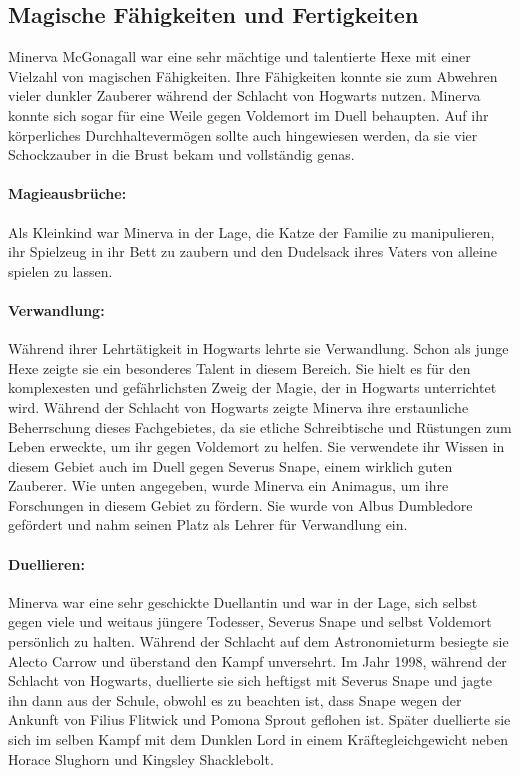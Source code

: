 \documentclass[a4paper, 10pt]{article}
\begin{document}
\subsection*{\Large Magische Fähigkeiten und Fertigkeiten}
Minerva McGonagall war eine sehr mächtige und talentierte Hexe mit einer Vielzahl von magischen Fähigkeiten. Ihre Fähigkeiten konnte sie zum Abwehren vieler dunkler Zauberer während der Schlacht von Hogwarts nutzen. Minerva konnte sich sogar für eine Weile gegen Voldemort im Duell behaupten. Auf ihr körperliches Durchhaltevermögen sollte auch hingewiesen werden, da sie vier Schockzauber in die Brust bekam und vollständig genas.
\paragraph{Magieausbrüche:} 
Als Kleinkind war Minerva in der Lage, die Katze der Familie zu manipulieren, ihr Spielzeug in ihr Bett zu zaubern und den Dudelsack ihres Vaters von alleine spielen zu lassen.
\paragraph{Verwandlung:} 
Während ihrer Lehrtätigkeit in Hogwarts lehrte sie Verwandlung. Schon als junge Hexe zeigte sie ein besonderes Talent in diesem Bereich. Sie hielt es für den komplexesten und gefährlichsten Zweig der Magie, der in Hogwarts unterrichtet wird. Während der Schlacht von Hogwarts zeigte Minerva ihre erstaunliche Beherrschung dieses Fachgebietes, da sie etliche Schreibtische und Rüstungen zum Leben erweckte, um ihr gegen Voldemort zu helfen. Sie verwendete ihr Wissen in diesem Gebiet auch im Duell gegen Severus Snape, einem wirklich guten Zauberer. Wie unten angegeben, wurde Minerva ein Animagus, um ihre Forschungen in diesem Gebiet zu fördern. Sie wurde von Albus Dumbledore gefördert und nahm seinen Platz als Lehrer für Verwandlung ein.
\paragraph{Duellieren:}
Minerva war eine sehr geschickte Duellantin und war in der Lage, sich selbst gegen viele und weitaus jüngere Todesser, Severus Snape und selbst Voldemort persönlich zu halten. Während der Schlacht auf dem Astronomieturm besiegte sie Alecto Carrow und überstand den Kampf unversehrt. Im Jahr 1998, während der Schlacht von Hogwarts, duellierte sie sich heftigst mit Severus Snape und jagte ihn dann aus der Schule, obwohl es zu beachten ist, dass Snape wegen der Ankunft von Filius Flitwick und Pomona Sprout geflohen ist. Später duellierte sie sich im selben Kampf mit dem Dunklen Lord in einem Kräftegleichgewicht neben Horace Slughorn und Kingsley Shacklebolt.
\end{document}
